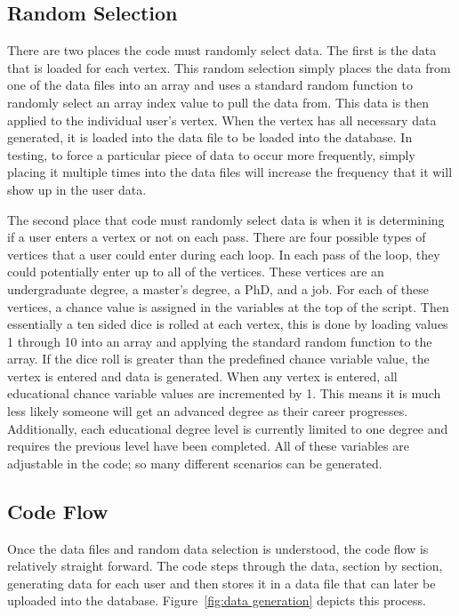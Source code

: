\subsection{Random Selection}
There are two places the code must randomly select data.  The first is the
data that is loaded for each vertex.  This random selection simply places the data
from one of the data files into an array and uses a standard random function
to randomly select an array index value to pull the data from.  This data is then
applied to the individual user's vertex.  When the vertex has all necessary data
generated, it is loaded into the data file to be loaded into the database.  In
testing, to force a particular piece of data to occur more frequently,
simply placing it multiple times into the data files will increase the
frequency that it will show up in the user data.

The second place that code must randomly select data is when it is determining
if a user enters a vertex or not on each pass.  There are four possible types
of vertices that a user could enter during each loop.  In each pass of the loop,
they could potentially enter up to all of the vertices.  These vertices are an
undergraduate degree, a master's degree, a PhD, and a job.  For each of these
vertices, a chance value is assigned in the variables at the top of the script. 
Then essentially a ten sided dice is rolled at each vertex, this is done by
loading values 1 through 10 into an array and applying the standard random
function to the array.  If the dice roll is greater than the predefined chance
variable value, the vertex is entered and data is generated.  When any vertex is
entered, all educational chance variable values are incremented by 1.  This
means it is much less likely someone will get an advanced degree as their career
progresses.  Additionally, each educational degree level is currently limited to
one degree and requires the previous level have been completed.  All of these
variables are adjustable in the code; so many different scenarios can be generated.


\subsection{Code Flow}
Once the data files and random data selection is understood, the code flow is
relatively straight forward.  The code steps through the data, section by
section, generating data for each user and then stores it in a data file that
can later be uploaded into the database.  Figure~\ref {fig:data generation}
depicts this process.

